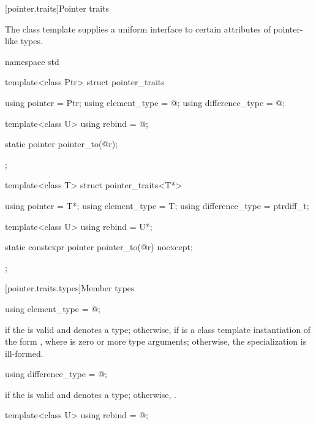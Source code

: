 [pointer.traits]{Pointer traits}

\pnum
The class template  supplies a uniform interface to certain
attributes of pointer-like types.

%
\begin{codeblock}
namespace std {
  template<class Ptr> struct pointer_traits {
    using pointer         = Ptr;
    using element_type    = @\seebelow@;
    using difference_type = @\seebelow@;

    template<class U> using rebind = @\seebelow@;

    static pointer pointer_to(@\seebelow@ r);
  };

  template<class T> struct pointer_traits<T*> {
    using pointer         = T*;
    using element_type    = T;
    using difference_type = ptrdiff_t;

    template<class U> using rebind = U*;

    static constexpr pointer pointer_to(@\seebelow@ r) noexcept;
  };
}
\end{codeblock}

[pointer.traits.types]{Member types}

%
\begin{itemdecl}
using element_type = @\seebelow@;
\end{itemdecl}

\begin{itemdescr}
\pnum
\ctype {} if
the   is valid and denotes a
type; otherwise,  if
 is a class template instantiation of the form ,
where  is zero or more type arguments; otherwise, the specialization is
ill-formed.
\end{itemdescr}

%
\begin{itemdecl}
using difference_type = @\seebelow@;
\end{itemdecl}

\begin{itemdescr}
\pnum
\ctype {} if
the   is valid and denotes a
type; otherwise,
.
\end{itemdescr}

%
\begin{itemdecl}
template<class U> using rebind = @\seebelow@;
\end{itemdecl}

